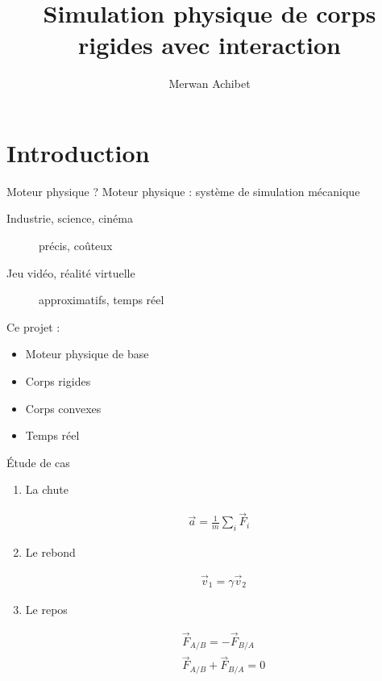 \documentclass{beamer}
\title{Simulation physique de corps rigides avec interaction}
\author{Merwan Achibet}
\date{}
\begin{document}
\shorthandoff{!} %

\begin{frame}
  \maketitle
\end{frame}

\section{Introduction}

\begin{frame}{Moteur physique ?}
  Moteur physique : système de simulation mécanique
  \begin{description}
  \item[Industrie, science, cinéma] précis, coûteux 
  \item[Jeu vidéo, réalité virtuelle] approximatifs, temps réel
  \end{description}

  \vfill
  
  Ce projet :
  \begin{itemize}
  \item Moteur physique de base 
  \item Corps rigides
  \item Corps convexes
  \item Temps réel
  \end{itemize}
\end{frame}

\begin{frame}{\'Etude de cas}
  \begin{enumerate}
    \item
      La chute

      \begin{align*}
        \vec{a} = \frac{1}{m} \sum_i \vec{F}_i
      \end{align*}
    \item
      Le rebond

      \begin{align*}
        &\vec{v}_1 = \gamma \vec{v}_2
      \end{align*}
    \item
      Le repos

      \begin{align*}
        &\vec{F}_{A/B} = -\vec{F}_{B/A} \\
        &\vec{F}_{A/B} + \vec{F}_{B/A} = 0
      \end{align*}
  \end{enumerate}
\end{frame}
\end{document}
